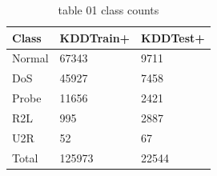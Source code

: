 \begin{table}[t]
\centering
\caption{table 01 class counts}
\label{tab:class_counts}
\begin{tabular}{lll}
\hline
Class & KDDTrain+ & KDDTest+ \\
\hline
Normal & 67343 & 9711 \\
DoS & 45927 & 7458 \\
Probe & 11656 & 2421 \\
R2L & 995 & 2887 \\
U2R & 52 & 67 \\
Total & 125973 & 22544 \\
\hline
\end{tabular}
\end{table}
